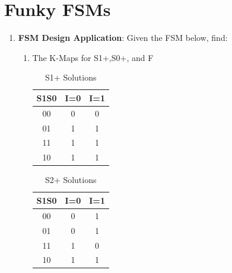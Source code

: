 \documentclass{article}
\begin{document}
\section{Funky FSMs}
    \begin{enumerate}[label=(\alph*)]
        \item \textbf{FSM Design Application}: Given the FSM below, find:
        \begin{enumerate}[label=(\roman*),nolistsep]
            \item The K-Maps for S1+,S0+, and F
            \begin{table}[h]
\centering
\begin{tabular}{|c|c|c|}
\hline
S1S0 & I=0 & I=1 \\
\hline
00 & 0 & 0 \\
01 & 1 & 1 \\
11 & 1 & 1 \\
10 & 1 & 1 \\
\hline
\end{tabular}
\caption{S1+ Solutions}
\end{table}

\begin{table}[h]
\centering
\begin{tabular}{|c|c|c|}
\hline
S1S0 & I=0 & I=1 \\
\hline
00 & 0 & 1 \\
01 & 0 & 1 \\
11 & 1 & 0 \\
10 & 1 & 1 \\
\hline
\end{tabular}
\caption{S2+ Solutions}
\end{table}


\end{enumerate}
\end{enumerate}
\end{document}
